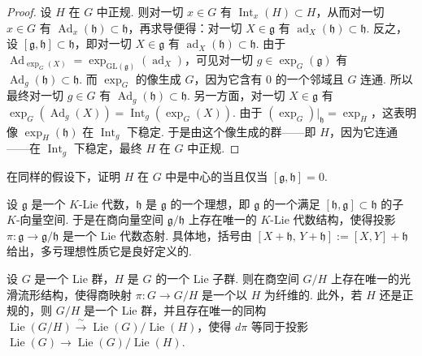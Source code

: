\begin{proof}
设 $H$ 在 $G$ 中正规. 则对一切 $x\in G$ 有 $\operatorname{Int}_{x}(H)\subset H$，从而对一切 $x\in G$ 有 $\operatorname{Ad}_{x}(\mathfrak h)\subset\mathfrak h$，再求导便得：对一切 $X\in\mathfrak g$ 有 $\operatorname{ad}_{X}(\mathfrak h)\subset\mathfrak h$.
反之，设 $[\mathfrak g,\mathfrak h]\subset\mathfrak h$，即对一切 $X\in\mathfrak g$ 有 $\operatorname{ad}_{X}(\mathfrak h)\subset\mathfrak h$. 由于 $\operatorname{Ad}_{\exp_{G}(X)}=\exp_{\mathrm{GL}(\mathfrak g)}(\operatorname{ad}_{X})$，可见对一切 $g\in\exp_{G}(\mathfrak g)$ 有 $\operatorname{Ad}_{g}(\mathfrak h)\subset\mathfrak h$. 而 $\exp_{G}$ 的像生成 $G$，因为它含有 $0$ 的一个邻域且 $G$ 连通. 所以最终对一切 $g\in G$ 有 $\operatorname{Ad}_{g}(\mathfrak h)\subset\mathfrak h$. 另一方面，对一切 $X\in\mathfrak g$ 有 $\exp_{G}(\operatorname{Ad}_{g}(X))=\operatorname{Int}_{g}(\exp_{G}(X))$. 由于 $(\exp_{G})|_{\mathfrak h}=\exp_{H}$，这表明像 $\exp_{H}(\mathfrak h)$ 在 $\operatorname{Int}_{g}$ 下稳定. 于是由这个像生成的群——即 $H$，因为它连通——在 $\operatorname{Int}_{g}$ 下稳定，最终 $H$ 在 $G$ 中正规.
\end{proof}

\begin{exercise*}
在同样的假设下，证明 $H$ 在 $G$ 中是中心的当且仅当 $[\mathfrak g,\mathfrak h]=0$.
\end{exercise*}

\begin{numpara}[商]\label{np:lie-1-7-13}
设 $\mathfrak g$ 是一个 $K$-Lie 代数，$\mathfrak h$ 是 $\mathfrak g$ 的一个理想，即 $\mathfrak g$ 的一个满足 $[\mathfrak h,\mathfrak g]\subset\mathfrak h$ 的子 $K$-向量空间. 于是在商向量空间 $\mathfrak g/\mathfrak h$ 上存在唯一的 $K$-Lie 代数结构，使得投影 $\pi:\mathfrak g\longrightarrow\mathfrak g/\mathfrak h$ 是一个 Lie 代数态射. 具体地，括号由 $[X+\mathfrak h,\,Y+\mathfrak h]:=[X,Y]+\mathfrak h$ 给出，多亏理想性质它是良好定义的.
\end{numpara}

\begin{proposition*}
设 $G$ 是一个 Lie 群，$H$ 是 $G$ 的一个 Lie 子群. 则在商空间 $G/H$ 上存在唯一的光滑流形结构，使得商映射 $\pi:G\longrightarrow G/H$ 是一个以 $H$ 为纤维的. 此外，若 $H$ 还是正规的，则 $G/H$ 是一个 Lie 群，并且存在唯一的同构 $\operatorname{Lie}(G/H)\xrightarrow{\ \sim\ }\operatorname{Lie}(G)/\operatorname{Lie}(H)$，使得 $d\pi$ 等同于投影 $\operatorname{Lie}(G)\longrightarrow\operatorname{Lie}(G)/\operatorname{Lie}(H)$.
\end{proposition*}

